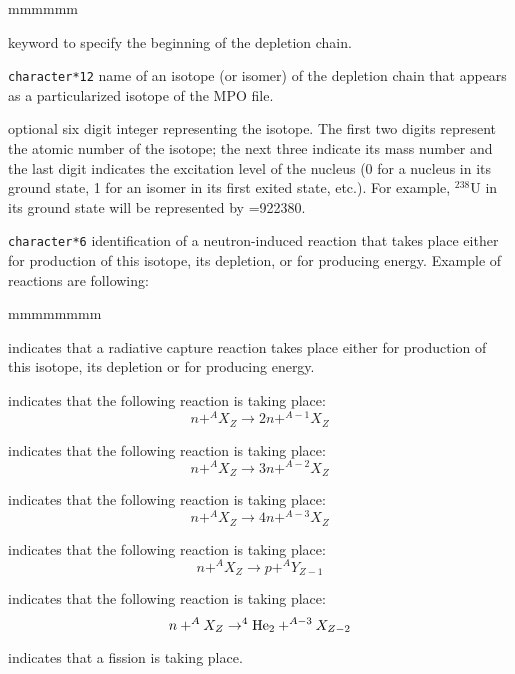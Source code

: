 \begin{ListeDeDescription}{mmmmmm}

\item[\moc{CHAIN}] keyword to specify the beginning of the depletion chain.

\item[\dusa{NAMDPL}] {\tt character*12} name of an isotope (or isomer) of the
depletion chain that appears as a particularized isotope of the MPO file.

\item[\dusa{izae}] optional six digit integer representing the isotope. The first two
digits represent the atomic number of the isotope; the next three indicate its
mass number and the last digit indicates the  excitation level of the nucleus (0
for a nucleus in its ground state, 1 for an isomer in its first exited state,
etc.). For example, $^{238}$U in its ground state will be represented by
=922380.

\item[\dusa{reaction}] {\tt character*6} identification of a neutron-induced
reaction that takes place either for production of this isotope, its depletion,
or for producing energy. Example of reactions are following:

\begin{ListeDeDescription}{mmmmmmmm}
\item[\moc{NG}] indicates that a radiative capture reaction takes place either
for production of this isotope, its depletion or for producing energy.

\item[\moc{N2N}] indicates that the following reaction is taking place:
$$ n +^{A}X_Z \to 2 n + ^{A-1}X_Z$$

\item[\moc{N3N}] indicates that the following reaction is taking place:
$$ n +^{A}X_Z \to 3 n + ^{A-2}X_Z$$

\item[\moc{N4N}] indicates that the following reaction is taking place:
$$ n +^{A}X_Z \to 4 n + ^{A-3}X_Z$$

\item[\moc{NP}] indicates that the following reaction is taking place:
$$ n +^{A}X_Z \to p + ^AY_{Z-1}$$

\item[\moc{NA}] indicates that the following reaction is taking place:
$$ n +^{A}X_Z \to ^4{\rm He}_2 + ^{A-3}X_{Z-2}$$

\item[\moc{NFTOT}] indicates that a fission is taking place.
\end{ListeDeDescription}


\end{ListeDeDescription}
